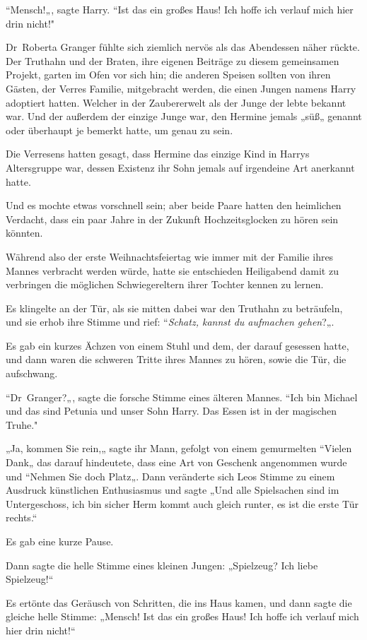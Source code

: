 {“Mensch!„, sagte Harry. “Ist das ein großes Haus! Ich hoffe ich verlauf mich hier drin nicht!"

Dr~Roberta Granger fühlte sich ziemlich nervös als das Abendessen näher rückte. Der Truthahn und der Braten, ihre eigenen Beiträge zu diesem gemeinsamen Projekt, garten im Ofen vor sich hin; die anderen Speisen sollten von ihren Gästen, der Verres Familie, mitgebracht werden, die einen Jungen namens Harry adoptiert hatten. Welcher in der Zaubererwelt als der Junge der lebte bekannt war. Und der außerdem der einzige Junge war, den Hermine jemals „süß„ genannt oder überhaupt je bemerkt hatte, um genau zu sein.

Die Verresens hatten gesagt, dass Hermine das einzige Kind in Harrys Altersgruppe war, dessen Existenz ihr Sohn jemals auf irgendeine Art anerkannt hatte.

Und es mochte etwas vorschnell sein; aber beide Paare hatten den heimlichen Verdacht, dass ein paar Jahre in der Zukunft Hochzeitsglocken zu hören sein könnten.

Während also der erste Weihnachtsfeiertag wie immer mit der Familie ihres Mannes verbracht werden würde, hatte sie entschieden Heiligabend damit zu verbringen die möglichen Schwiegereltern ihrer Tochter kennen zu lernen.

Es klingelte an der Tür, als sie mitten dabei war den Truthahn zu beträufeln, und sie erhob ihre Stimme und rief: “\emph{Schatz, kannst du aufmachen gehen}?„.

Es gab ein kurzes Ächzen von einem Stuhl und dem, der darauf gesessen hatte, und dann waren die schweren Tritte ihres Mannes zu hören, sowie die Tür, die aufschwang.

“Dr~Granger?„, sagte die forsche Stimme eines älteren Mannes. “Ich bin Michael und das sind Petunia und unser Sohn Harry. Das Essen ist in der magischen Truhe."

„Ja, kommen Sie rein,„ sagte ihr Mann, gefolgt von einem gemurmelten “Vielen Dank„ das darauf hindeutete, dass eine Art von Geschenk angenommen wurde und “Nehmen Sie doch Platz„. Dann veränderte sich Leos Stimme zu einem Ausdruck künstlichen Enthusiasmus und sagte „Und alle Spielsachen sind im Untergeschoss, ich bin sicher Herm kommt auch gleich runter, es ist die erste Tür rechts.“

Es gab eine kurze Pause.

Dann sagte die helle Stimme eines kleinen Jungen: „Spielzeug? Ich liebe Spielzeug!“

Es ertönte das Geräusch von Schritten, die ins Haus kamen, und dann sagte die gleiche helle Stimme: „Mensch! Ist das ein großes Haus! Ich hoffe ich verlauf mich hier drin nicht!“

}

